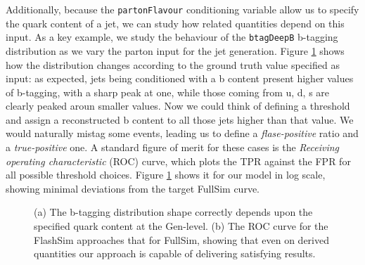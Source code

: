 Additionally, because the \texttt{partonFlavour} conditioning variable allow us to specify the quark content of a jet, we can study how related quantities depend on this input. As a key example, we study the behaviour of the \texttt{btagDeepB} b-tagging distribution as we vary the parton input for the jet generation. Figure \ref{fig:roc1} shows how the distribution changes according to the ground truth value specified as input: as expected, jets being conditioned with a b content present higher values of b-tagging, with a sharp peak at one, while those coming from u, d, s are clearly peaked aroun smaller values. Now we could think of defining a threshold and assign a reconstructed b content to all those jets higher than that value. We would naturally mistag some events, leading us to define a \emph{flase-positive} ratio and a \emph{true-positive} one. A standard figure of merit for these cases is the \emph{Receiving operating characteristic} (ROC) curve, which plots the TPR against the FPR for all possible threshold choices. Figure \ref{fig:roc1} shows it for our model in log scale, showing minimal deviations from the target FullSim curve.


\begin{figure}
    \myfloatalign
    \caption[b-tagging and ROC]{ (a) The b-tagging distribution shape correctly depends upon the specified quark content at the Gen-level. (b) The ROC curve for the FlashSim approaches that for FullSim, showing that even on derived quantities our approach is capable of delivering satisfying results.}\label{fig:roc1}
    
\end{figure}

